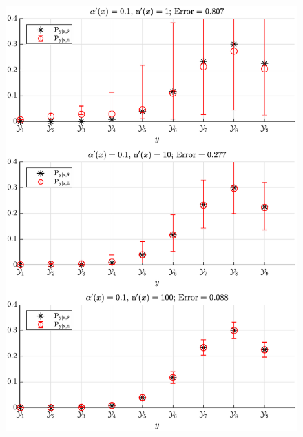 \documentclass[aspectratio=169,usenames,dvipsnames]{beamer}
\begin{document}
\begin{frame}
\begin{columns}[c]
\begin{column}{0.35\linewidth}
\begin{figure}
\centering
\includegraphics[width=1\linewidth]{P_yx_error_a0_0_1.pdf}
\end{figure}
\end{column}


\end{columns}
\end{frame}
\end{document}
